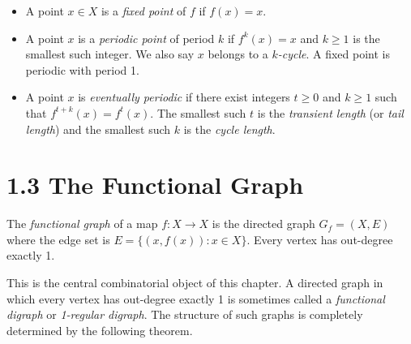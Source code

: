 \begin{definition}
\end{definition}
\begin{itemize}
  \item A point $x \in X$ is a \textit{fixed point} of $f$ if $f(x) = x$.
  \item A point $x$ is a \textit{periodic point} of period $k$ if $f^k(x) = x$ and $k \geq 1$ is the smallest such integer. We also say $x$ belongs to a \textit{$k$-cycle}. A fixed point is periodic with period 1.
  \item A point $x$ is \textit{eventually periodic} if there exist integers $t \geq 0$ and $k \geq 1$ such that $f^{t+k}(x) = f^t(x)$. The smallest such $t$ is the \textit{transient length} (or \textit{tail length}) and the smallest such $k$ is the \textit{cycle length}.
\end{itemize}


\section{1.3 The Functional Graph}

\begin{definition}
The \textit{functional graph} of a map $f: X \to X$ is the directed graph $G_f = (X, E)$ where the edge set is $E = \{ (x, f(x)) : x \in X\} $. Every vertex has out-degree exactly 1.

This is the central combinatorial object of this chapter. A directed graph in which every vertex has out-degree exactly 1 is sometimes called a \textit{functional digraph} or \textit{1-regular digraph}. The structure of such graphs is completely determined by the following theorem.
\end{definition}

